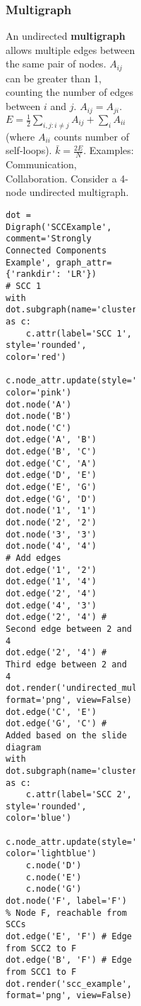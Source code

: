 \documentclass{article}
\begin{document}
\begin{figure}[h]
\begin{figure}[h]
\begin{figure}[h]
\begin{figure}[h]
\subsubsection{Multigraph}
An undirected \textbf{multigraph} allows multiple edges between the same pair of nodes.
$A_{ij}$ can be greater than 1, counting the number of edges between $i$ and $j$.
$A_{ij} = A_{ji}$.
$E = \frac{1}{2} \sum_{i, j: i \neq j} A_{ij} + \sum_i A_{ii}$ (where $A_{ii}$ counts number of self-loops).
$\bar{k} = \frac{2E}{N}$.
Examples: Communication, Collaboration.
Consider a 4-node undirected multigraph.
\begin{verbatim}
dot = Digraph('SCCExample', comment='Strongly Connected Components Example', graph_attr={'rankdir': 'LR'})
# SCC 1
with dot.subgraph(name='cluster_scc1') as c:
    c.attr(label='SCC 1', style='rounded', color='red')
    c.node_attr.update(style='filled', color='pink')
dot.node('A')
dot.node('B')
dot.node('C')
dot.edge('A', 'B')
dot.edge('B', 'C')
dot.edge('C', 'A')
dot.edge('D', 'E')
dot.edge('E', 'G')
dot.edge('G', 'D')
dot.node('1', '1')
dot.node('2', '2')
dot.node('3', '3')
dot.node('4', '4')
# Add edges
dot.edge('1', '2')
dot.edge('1', '4')
dot.edge('2', '4')
dot.edge('4', '3')
dot.edge('2', '4') # Second edge between 2 and 4
dot.edge('2', '4') # Third edge between 2 and 4
dot.render('undirected_multigraph', format='png', view=False)
dot.edge('C', 'E')
dot.edge('G', 'C') # Added based on the slide diagram
with dot.subgraph(name='cluster_scc2') as c:
    c.attr(label='SCC 2', style='rounded', color='blue')
    c.node_attr.update(style='filled', color='lightblue')
    c.node('D')
    c.node('E')
    c.node('G')
dot.node('F', label='F') % Node F, reachable from SCCs
dot.edge('E', 'F') # Edge from SCC2 to F
dot.edge('B', 'F') # Edge from SCC1 to F
dot.render('scc_example', format='png', view=False)
\end{verbatim}
\begin{figure}[h]

\end{figure}
\end{figure}
\end{figure}
\end{figure}
\end{figure}
\end{document}
